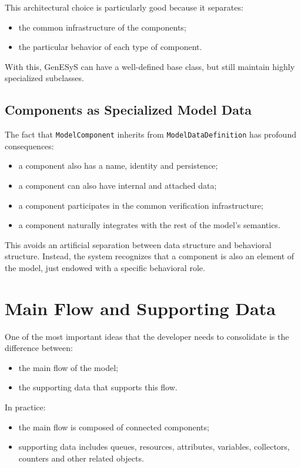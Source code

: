 This architectural choice is particularly good because it separates:
\begin{itemize}
 \item the common infrastructure of the components;
 \item the particular behavior of each type of component.
\end{itemize}

With this, GenESyS can have a well-defined base class, but still maintain highly specialized subclasses.

\subsection{Components as Specialized Model Data}
\label{subsec:cap8_componentes_modeldata_especializados}

The fact that \texttt{ModelComponent} inherits from \texttt{ModelDataDefinition} has profound consequences:
\begin{itemize}
 \item a component also has a name, identity and persistence;
 \item a component can also have internal and attached data;
 \item a component participates in the common verification infrastructure;
 \item a component naturally integrates with the rest of the model's semantics.
\end{itemize}

This avoids an artificial separation between data structure and behavioral structure. Instead, the system recognizes that a component is also an element of the model, just endowed with a specific behavioral role.

\section{Main Flow and Supporting Data}
\label{sec:cap8_fluxo_principal_dados_apoio}

One of the most important ideas that the developer needs to consolidate is the difference between:
\begin{itemize}
 \item the main flow of the model;
 \item the supporting data that supports this flow.
\end{itemize}

In practice:
\begin{itemize}
 \item the main flow is composed of connected components;
 \item supporting data includes queues, resources, attributes, variables, collectors, counters and other related objects.
\end{itemize}

